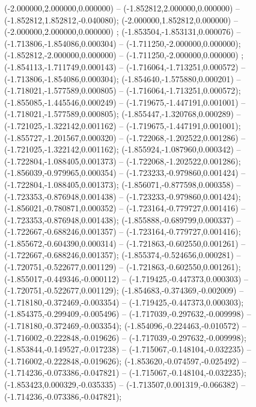  (-2.000000,2.000000,0.000000) -- (-1.852812,2.000000,0.000000) -- (-1.852812,1.852812,-0.040080);
 (-2.000000,1.852812,0.000000) -- (-2.000000,2.000000,0.000000) ;
 (-1.853504,-1.853131,0.000076) -- (-1.713806,-1.854086,0.000304) -- (-1.711250,-2.000000,0.000000);
 (-1.852812,-2.000000,0.000000) -- (-1.711250,-2.000000,0.000000) ;
 (-1.854113,-1.711749,0.000143) -- (-1.716064,-1.713251,0.000572) -- (-1.713806,-1.854086,0.000304);
 (-1.854640,-1.575880,0.000201) -- (-1.718021,-1.577589,0.000805) -- (-1.716064,-1.713251,0.000572);
 (-1.855085,-1.445546,0.000249) -- (-1.719675,-1.447191,0.001001) -- (-1.718021,-1.577589,0.000805);
 (-1.855447,-1.320768,0.000289) -- (-1.721025,-1.322142,0.001162) -- (-1.719675,-1.447191,0.001001);
 (-1.855727,-1.201567,0.000320) -- (-1.722068,-1.202522,0.001286) -- (-1.721025,-1.322142,0.001162);
 (-1.855924,-1.087960,0.000342) -- (-1.722804,-1.088405,0.001373) -- (-1.722068,-1.202522,0.001286);
 (-1.856039,-0.979965,0.000354) -- (-1.723233,-0.979860,0.001424) -- (-1.722804,-1.088405,0.001373);
 (-1.856071,-0.877598,0.000358) -- (-1.723353,-0.876948,0.001438) -- (-1.723233,-0.979860,0.001424);
 (-1.856021,-0.780871,0.000352) -- (-1.723164,-0.779727,0.001416) -- (-1.723353,-0.876948,0.001438);
 (-1.855888,-0.689799,0.000337) -- (-1.722667,-0.688246,0.001357) -- (-1.723164,-0.779727,0.001416);
 (-1.855672,-0.604390,0.000314) -- (-1.721863,-0.602550,0.001261) -- (-1.722667,-0.688246,0.001357);
 (-1.855374,-0.524656,0.000281) -- (-1.720751,-0.522677,0.001129) -- (-1.721863,-0.602550,0.001261);
 (-1.855017,-0.449346,-0.000112) -- (-1.719425,-0.447373,0.000303) -- (-1.720751,-0.522677,0.001129);
 (-1.854683,-0.374369,-0.002009) -- (-1.718180,-0.372469,-0.003354) -- (-1.719425,-0.447373,0.000303);
 (-1.854375,-0.299409,-0.005496) -- (-1.717039,-0.297632,-0.009998) -- (-1.718180,-0.372469,-0.003354);
 (-1.854096,-0.224463,-0.010572) -- (-1.716002,-0.222848,-0.019626) -- (-1.717039,-0.297632,-0.009998);
 (-1.853844,-0.149527,-0.017238) -- (-1.715067,-0.148104,-0.032235) -- (-1.716002,-0.222848,-0.019626);
 (-1.853620,-0.074597,-0.025492) -- (-1.714236,-0.073386,-0.047821) -- (-1.715067,-0.148104,-0.032235);
 (-1.853423,0.000329,-0.035335) -- (-1.713507,0.001319,-0.066382) -- (-1.714236,-0.073386,-0.047821);
